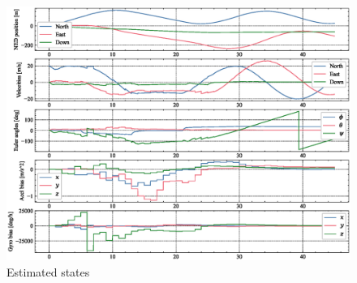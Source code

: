 \begin{figure}
    \centering
    \includegraphics[clip, trim= 0cm 0cm 0cm 0cm, width = \textwidth]{figures/sim_2.eps}
    \caption{Estimated states}
    \label{fig:1_2}
\end{figure}
